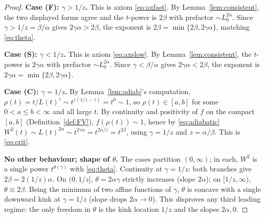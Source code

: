 \documentclass{amsart}
\theoremstyle{definition}
\newcommand{\asymp}{\sim}
\begin{document}
\begin{proof}
\textbf{Case (F): $\gamma>1/z$.} This is axiom \eqref{eq:axfast}. By
Lemma~\ref{lem:consistent}, the two displayed forms agree and the $t$-power is
$2\beta$ with prefactor $\asymp L_0^{2\alpha}$. Since
$\gamma>1/z=\beta/\alpha$ gives $2\gamma\alpha>2\beta$, the exponent is
$2\beta=\min\{2\beta,2\gamma\alpha\}$, matching \eqref{eq:theta}.

\medskip\noindent\textbf{Case (S): $\gamma<1/z$.} This is axiom \eqref{eq:axslow}.
By Lemma~\ref{lem:consistent}, the $t$-power is $2\gamma\alpha$ with prefactor
$\asymp L_0^{2\alpha}$. Since $\gamma<\beta/\alpha$ gives $2\gamma\alpha<2\beta$,
the exponent is $2\gamma\alpha=\min\{2\beta,2\gamma\alpha\}$.

\medskip\noindent\textbf{Case (C): $\gamma=1/z$.} By Lemma~\ref{lem:adiab}'s
computation, $\rho(t)=t/L(t)^z\asymp t^{z(1/z-\gamma)}=t^0\asymp1$, so
$\rho(t)\in[a,b]$ for some $0<a\le b<\infty$ and all large $t$. By continuity and
positivity of $f$ on the compact $[a,b]$ (Definition~\ref{def:FV}),
$f(\rho(t))\asymp1$, hence by \eqref{eq:adiabatic}
$W^2(t)\asymp L(t)^{2\alpha}\asymp t^{2\gamma\alpha}=t^{2\alpha/z}=t^{2\beta}$,
using $\gamma=1/z$ and $z=\alpha/\beta$. This is \eqref{eq:crit}.

\medskip\noindent\textbf{No other behaviour; shape of $\theta$.} The cases
partition $(0,\infty)$; in each, $W^2$ is a single power $t^{\theta(\gamma)}$ with
\eqref{eq:theta}. Continuity at $\gamma=1/z$: both branches give
$2\beta=2(1/z)\alpha$. On $(0,1/z]$, $\theta=2\alpha\gamma$ strictly increases
(slope $2\alpha$); on $[1/z,\infty)$, $\theta\equiv2\beta$. Being the minimum of
two affine functions of $\gamma$, $\theta$ is concave with a single downward kink at
$\gamma=1/z$ (slope drops $2\alpha\to0$). This disproves any third leading regime:
the only freedom in $\theta$ is the kink location $1/z$ and the slopes $2\alpha,0$.
\end{proof}
\end{document}

